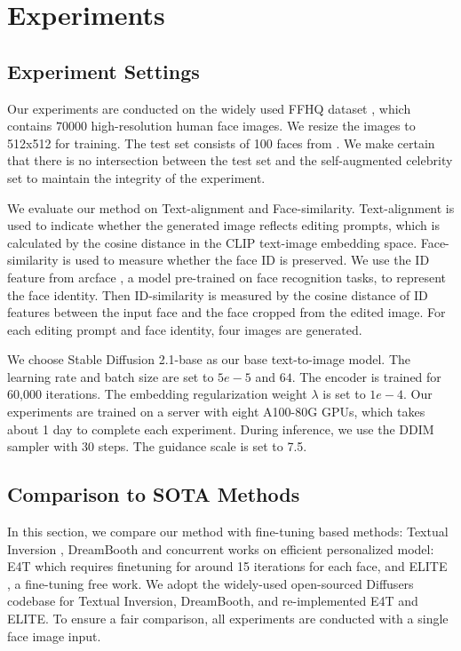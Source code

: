 


\section{Experiments}\label{sec:exp}


\subsection{Experiment Settings}
 Our experiments are conducted on the widely used FFHQ dataset \cite{karras2019style}, which contains $70000$ high-resolution human face images. We resize the images to 512x512 for training. The test set consists of 100 faces from \cite{liu2015faceattributes}. We make certain that there is no intersection between the test set and the self-augmented celebrity set to maintain the integrity of the experiment.

 We evaluate our method on Text-alignment and Face-similarity.  Text-alignment is used to indicate whether the generated image reflects editing prompts, which is calculated by the cosine distance in the CLIP text-image embedding space.  Face-similarity is used to measure whether the face ID is preserved. We use the ID feature from arcface \cite{deng2018arcface}, a model pre-trained on face recognition tasks, to represent the face identity. Then ID-similarity is measured by the cosine distance of ID features between the input face and the face cropped from the edited image. For each editing prompt and face identity, four images are generated.


We choose Stable Diffusion 2.1-base as our base text-to-image model. The learning rate and batch size are set to $5e-5$ and $64$. The encoder is trained for 60,000 iterations. The embedding regularization weight $\lambda$ is set to $1e-4$. Our experiments are trained on a server with eight A100-80G GPUs, which takes about 1 day to complete each experiment. During inference, we use the DDIM \cite{song2020denoising} sampler with 30 steps. The guidance scale is set to 7.5.





\subsection{Comparison to SOTA Methods}
In this section, we compare our method with fine-tuning based methods: Textual Inversion \cite{gal2022image}, DreamBooth \cite{ruiz2022dreambooth} and concurrent works on efficient personalized model: E4T \cite{gal2023designing} which requires finetuning for around 15 iterations for each face, and ELITE \cite{wei2023elite}, a fine-tuning free work. We adopt the widely-used open-sourced Diffusers codebase for Textual Inversion, DreamBooth, and re-implemented  E4T and  ELITE. To ensure a fair comparison, all experiments are conducted with a single face image input. 

